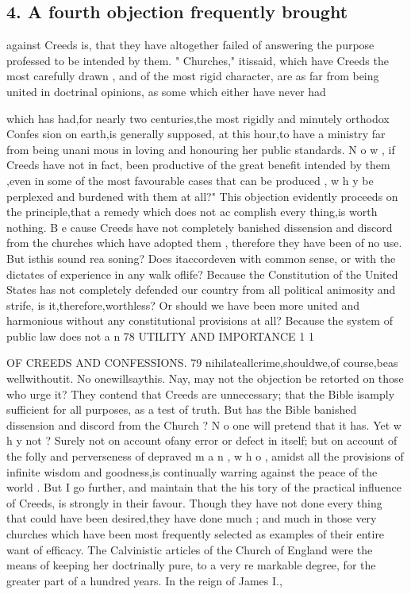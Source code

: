 \documentclass[
]{book}
\begin{document}
\hypertarget{a-fourth-objection-frequently-brought}{%
\subsection{4. A fourth objection frequently brought}\label{a-fourth-objection-frequently-brought}}

against Creeds is, that they have altogether
failed of answering the purpose professed to
be intended by them. " Churches," itissaid, which have Creeds the most carefully drawn ,
and of the most rigid character, are as far
from being united in doctrinal opinions, as some which either have never had

which has had,for nearly two centuries,the
most rigidly and minutely orthodox Confes
sion on earth,is generally supposed, at this
hour,to have a ministry far from being unani
mous in loving and honouring her public
standards. N o w , if Creeds have not in fact,
been productive of the great benefit intended
by them ,even in some of the most favourable
cases that can be produced , w h y be perplexed and burdened with them at all?"
This objection evidently proceeds on the principle,that a remedy which does not ac complish every thing,is worth nothing. B e
cause Creeds have not completely banished dissension and discord from the churches
which have adopted them , therefore they have been of no use. But isthis sound rea soning? Does itaccordeven with common
sense, or with the dictates of experience in any walk oflife? Because the Constitution of the United States has not completely defended our country from all political animosity and strife, is it,therefore,worthless? Or should we have been more united and harmonious without any constitutional provisions at all? Because the system of public law does not a n
78
UTILITY AND IMPORTANCE
1
1

OF CREEDS AND CONFESSIONS. 79
nihilateallcrime,shouldwe,of course,beas wellwithoutit. No onewillsaythis. Nay, may not the objection be retorted on those who urge it? They contend that Creeds are unnecessary; that the Bible isamply sufficient
for all purposes, as a test of truth. But has the Bible banished dissension and discord from the Church ? N o one will pretend that it has. Yet w h y not ? Surely not on account ofany error or defect in itself; but on account of the folly and perverseness of depraved m a n , w h o , amidst all the provisions of infinite wisdom and goodness,is continually warring against the peace of the world .
But I go further, and maintain that the his tory of the practical influence of Creeds, is strongly in their favour. Though they have
not done every thing that could have been
desired,they have done much ; and much in
those very churches which have been most
frequently selected as examples of their entire want of efficacy. The Calvinistic articles of
the Church of England were the means of keeping her doctrinally pure, to a very re markable degree, for the greater part of a
hundred years. In the reign of James I.,
\end{document}
